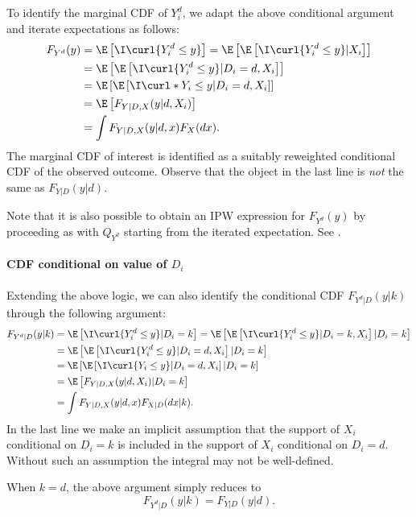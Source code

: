 To identify the marginal CDF of $Y^d_i$, we adapt the above conditional argument and iterate expectations as follows:
\begin{align}
	F_{Y^d}(y) &  = \E\left[ \I\curl{Y^d_i \leq y} \right] = \E\left[ \E\left[ \I\curl{Y^d_i \leq y}|X_i \right]\right]\\
	& = \E\left[ \E\left[ \I\curl{Y^d_i \leq y}|D_i=d, X_i \right]\right]\\
	& = \E\left[ \E\left[ \I\curl*{Y_i\leq y}| D_i=d, X_i \right]  \right]\\
	& = \E\left[  F_{Y|D, X}(y|d, X_i) \right]\\
	& = \int F_{Y|D, X}(y|d, x)F_X(dx).
\end{align} 
The marginal CDF of interest is identified as a suitably reweighted conditional CDF of the observed outcome. Observe that the object in the last line is \emph{not} the same as $F_{Y|D}(y|d)$. 

Note that it is also possible to obtain an IPW expression for $F_{Y^d}(y)$ by proceeding as with $Q_{Y^d}$ starting from the iterated expectation. See \cite{Donald2014EstimationInferenceDistribution}.

\paragraph{CDF conditional on value of $D_i$}
 
Extending the above logic, we can also identify the conditional CDF $F_{Y^d|D}(y|k)$ through the following argument:
\begin{align}
	F_{Y^d|D}(y|k)  & =  \E\left[ \I\curl{Y^d_i \leq y}|D_i=k \right] = \E\left[ \E\left[ \I\curl{Y^d_i \leq y}|D_i=k, X_i \right]|D_i=k\right]\\
	& =  \E\left[ \E\left[ \I\curl{Y^d_i \leq y}|D_i=d, X_i \right]|D_i=k\right]\\
	& = \E\left[ \E\left[ \I\curl{Y_i\leq y}|D_i=d, X_i \right]|D_i=k\right]\\
	& = \E\left[ F_{Y|D, X}(y|d, X_i)|D_i=k \right]\\
	& = \int F_{Y|D, X}(y|d, x) F_{X|D}(dx|k). \label{quantile:equation:counterfactual_distribution}
\end{align}
In the last line we make an implicit assumption  that  the support of $X_i$ conditional on $D_i=k$ is included in the support of $X_i$ conditional on $D_i=d$. Without such an assumption the integral may not be well-defined. 

When $k=d$, the above argument simply reduces to 
\begin{equation}
	 F_{Y^d|D}(y|k) = F_{Y|D}(y|d).
\end{equation}

